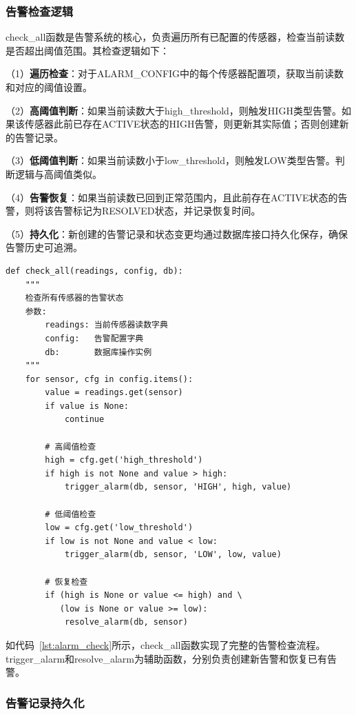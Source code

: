 \documentclass[12pt,a4paper]{ctexart}
\begin{document}
\subsubsection{告警检查逻辑}

check\_all函数是告警系统的核心，负责遍历所有已配置的传感器，检查当前读数是否超出阈值范围。其检查逻辑如下：

（1）\textbf{遍历检查}：对于ALARM\_CONFIG中的每个传感器配置项，获取当前读数和对应的阈值设置。

（2）\textbf{高阈值判断}：如果当前读数大于high\_threshold，则触发HIGH类型告警。如果该传感器此前已存在ACTIVE状态的HIGH告警，则更新其实际值；否则创建新的告警记录。

（3）\textbf{低阈值判断}：如果当前读数小于low\_threshold，则触发LOW类型告警。判断逻辑与高阈值类似。

（4）\textbf{告警恢复}：如果当前读数已回到正常范围内，且此前存在ACTIVE状态的告警，则将该告警标记为RESOLVED状态，并记录恢复时间。

（5）\textbf{持久化}：新创建的告警记录和状态变更均通过数据库接口持久化保存，确保告警历史可追溯。

\begin{lstlisting}[caption={告警检查核心逻辑},label={lst:alarm_check}]
def check_all(readings, config, db):
    """
    检查所有传感器的告警状态
    参数:
        readings: 当前传感器读数字典
        config:   告警配置字典
        db:       数据库操作实例
    """
    for sensor, cfg in config.items():
        value = readings.get(sensor)
        if value is None:
            continue
        
        # 高阈值检查
        high = cfg.get('high_threshold')
        if high is not None and value > high:
            trigger_alarm(db, sensor, 'HIGH', high, value)
        
        # 低阈值检查
        low = cfg.get('low_threshold')
        if low is not None and value < low:
            trigger_alarm(db, sensor, 'LOW', low, value)
        
        # 恢复检查
        if (high is None or value <= high) and \
           (low is None or value >= low):
            resolve_alarm(db, sensor)
\end{lstlisting}

如代码~\ref{lst:alarm_check}所示，check\_all函数实现了完整的告警检查流程。trigger\_alarm和resolve\_alarm为辅助函数，分别负责创建新告警和恢复已有告警。

\subsubsection{告警记录持久化}
\end{document}
